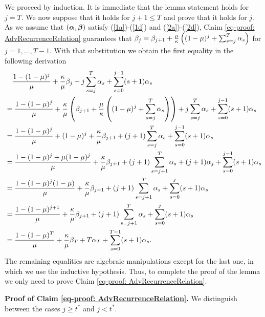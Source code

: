 \AdvTheoremDConstraints*
    We proceed by induction. It is immediate that the lemma statement holds for $j=T$. We now suppose that it holds for  $j+1 \leq T$ and  prove that it holds for $j$.  As we assume that $(\bm{\alpha},\bm{\beta})$ satisfy (\ref{1a})-(\ref{1d}) and (\ref{2a})-(\ref{2d}),  Claim \eqref{eq-proof: AdvRecurrenceRelation} guarantees that $\beta_{j} = \beta_{j+1} + \frac{\mu}{\kappa}\left( (1-\mu)^j + \sum_{s=j}^T \alpha_s \right)$ for $j = 1, \ldots, T-1$. With that substitution we obtain the first equality in the following derivation
    \begin{align*}
         &\quad \frac{1-(1-\mu)^j}{\mu} + \frac{\kappa}{\mu} \beta_j + j \sum_{s=j}^{T} \alpha_s + \sum_{s=0}^{j-1} (s+1) \alpha_s\\ &= \frac{1-(1-\mu)^j}{\mu} + \frac{\kappa}{\mu} \left( \beta_{j+1} + \frac{\mu}{\kappa} \left( (1-\mu)^j + \sum_{s=j}^T \alpha_s \right)\right) + j \sum_{s=j}^{T} \alpha_s + \sum_{s=0}^{j-1} (s+1) \alpha_s\\
         &= \frac{1-(1-\mu)^j}{\mu} + (1-\mu)^j + \frac{\kappa}{\mu} \beta_{j+1} + (j+1) \sum_{s=j}^T \alpha_s + \sum_{s=0}^{j-1}(s+1) \alpha_s\\
         &= \frac{1-(1-\mu)^j + \mu (1-\mu)^j}{\mu}  + \frac{\kappa}{\mu} \beta_{j+1} + (j+1) \sum_{s=j+1}^T \alpha_s + (j+1)\alpha_j +  \sum_{s=0}^{j-1}(s+1) \alpha_s\\
         &= \frac{1 - (1-\mu)^j(1-\mu)}{\mu} + \frac{\kappa}{\mu} \beta_{j+1} + (j+1) \sum_{s=j+1}^T \alpha_s + \sum_{s=0}^{j} (s+1) \alpha_s\\
         &= \frac{1 - (1-\mu)^{j+1}}{\mu} + \frac{\kappa}{\mu} \beta_{j+1} + (j+1) \sum_{s=j+1}^T \alpha_s + \sum_{s=0}^{j} (s+1) \alpha_s\\
         &= \frac{1- (1-\mu)^T}{\mu} + \frac{\kappa}{\mu} \beta_T + T \alpha_T + \sum_{s=0}^{T-1} (s+1) \alpha_s.
    \end{align*}
    The remaining equalities are algebraic manipulations except for the last one, in which we use the inductive hypothesis. Thus, to complete the proof of the lemma we only need to prove Claim \eqref{eq-proof: AdvRecurrenceRelation}.



\textbf{Proof of Claim \eqref{eq-proof: AdvRecurrenceRelation}.}
We distinguish between the cases $j \geq t^*$ and $j < t^*$.

